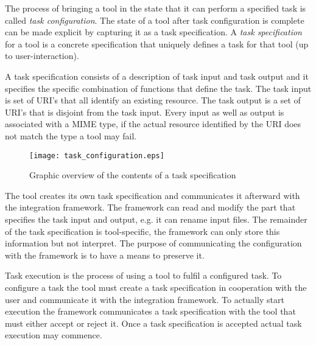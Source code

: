 \documentclass{article}
\begin{document}
   
   The process of bringing a tool in the state that it can perform a specified
   task is called \textit{task configuration}. The state of a tool after task
   configuration is complete can be made explicit by capturing it as a task
   specification.  A \textit{task specification} for a tool is a concrete
   specification that uniquely defines a task for that tool (up to
   user-interaction).

   \noindent A task specification consists of a description of task input and
   task output and it specifies the specific combination of functions that
   define the task. The task input is set of URI's that all identify an
   existing resource. The task output is a set of URI's that is disjoint from
   the task input. Every input as well as output is associated with a MIME
   type, if the actual resource identified by the URI does not match the type a
   tool may fail.

   \begin{figure}[H]
    \begin{center}
     \texttt{[image: task\_configuration.eps]}
    \end{center}
    \caption{Graphic overview of the contents of a task specification}
   \end{figure}

 
   The tool creates its own task specification and communicates it afterward
   with the integration framework. The framework can read and modify the part
   that specifies the task input and output, e.g. it can rename input files.
   The remainder of the task specification is tool-specific, the framework can
   only store this information but not interpret. The purpose of communicating
   the configuration with the framework is to have a means to preserve it.
   
   Task execution is the process of using a tool to fulfil a configured task.
   To configure a task the tool must create a task specification in cooperation
   with the user and communicate it with the integration framework. To actually
   start execution the framework communicates a task specification with the
   tool that must either accept or reject it. Once a task specification is
   accepted actual task execution may commence.

\end{document}

